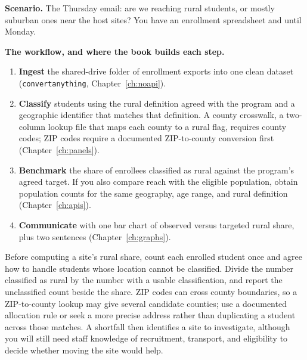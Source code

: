 \begin{appliedexample}\label{ae:ch01-funder}
\textbf{Scenario.} The Thursday email: are we reaching rural students, or mostly suburban ones near the host sites? You have an enrollment spreadsheet and until Monday.

\medskip
\textbf{The workflow, and where the book builds each step.}
\begin{enumerate}
    \item \textbf{Ingest} the shared-drive folder of enrollment exports into one clean dataset (\texttt{convertanything}, Chapter~\ref{ch:noapi}).
    \item \textbf{Classify} students using the rural definition agreed with the program and a geographic identifier that matches that definition. A county crosswalk, a two-column lookup file that maps each county to a rural flag, requires county codes; ZIP codes require a documented ZIP-to-county conversion first (Chapter~\ref{ch:panels}).
    \item \textbf{Benchmark} the share of enrollees classified as rural against the program's agreed target. If you also compare reach with the eligible population, obtain population counts for the same geography, age range, and rural definition (Chapter~\ref{ch:apis}).
    \item \textbf{Communicate} with one bar chart of observed versus targeted rural share, plus two sentences (Chapter~\ref{ch:graphs}).
\end{enumerate}
Before computing a site's rural share, count each enrolled student once and agree how to handle students whose location cannot be classified. Divide the number classified as rural by the number with a usable classification, and report the unclassified count beside the share. ZIP codes can cross county boundaries, so a ZIP-to-county lookup may give several candidate counties; use a documented allocation rule or seek a more precise address rather than duplicating a student across those matches. A shortfall then identifies a site to investigate, although you will still need staff knowledge of recruitment, transport, and eligibility to decide whether moving the site would help.
\end{appliedexample}

